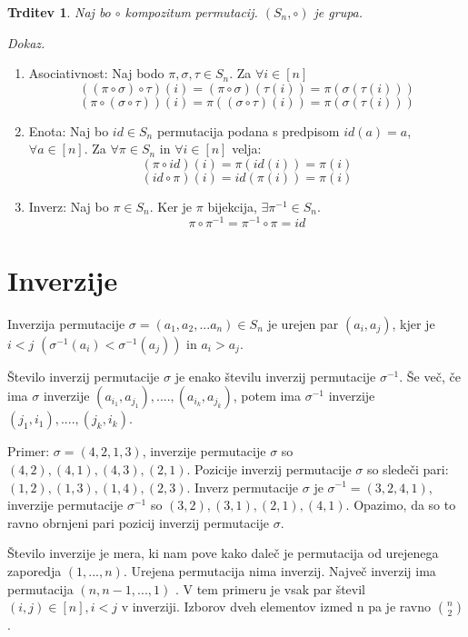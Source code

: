 \documentclass[a4paper, 12pt]{book}
\newtheorem{trditev}{Trditev}[chapter]
\newenvironment{dokaz}{\emph{Dokaz.}\ }{\hspace{\fill}{$\Box$}}
\let\ab\allowbreak
\begin{document}
\begin{trditev}
    Naj bo $\circ$ kompozitum permutacij. $(S_n, \circ)$ je grupa.
\end{trditev}
\begin{dokaz}
    \begin{enumerate}
        \item Asociativnost: Naj bodo $\pi, \sigma, \tau \in S_n$. Za $\forall i \in [n]$ 
        \[
            ((\pi \circ \sigma) \circ \tau)(i) = (\pi \circ \sigma)(\tau(i)) = \pi(\sigma(\tau(i)))
        \]
        \[
            (\pi \circ (\sigma \circ \tau))(i) = \pi((\sigma \circ \tau)(i)) = \pi(\sigma(\tau(i))) 
        \]
        \item Enota: Naj bo $id \in S_n$ permutacija podana s predpisom $id(a) = a$, $\forall a \in [n]$. Za $\forall \pi \in S_n$ in $\forall i \in [n]$ velja:
        \[
            (\pi \circ id)(i) = \pi(id(i)) = \pi(i)
        \]
        \[
            (id \circ \pi)(i) = id(\pi(i)) = \pi(i)
        \]
        \item Inverz: Naj bo $\pi \in S_n$. Ker je $\pi$ bijekcija, $\exists \pi^{-1} \in S_n$.
        \[
            \pi \circ \pi^{-1} = \pi^{-1} \circ \pi = id
        \]
    \end{enumerate}
\end{dokaz}

\chapter{ Inverzije }

Inverzija permutacije $\sigma = (a_1, a_2,... a_n) \in S_n$ je urejen par $(a_i, a_j)$, kjer je $i < j$ $(\sigma^{-1}(a_i) < \sigma^{-1}(a_j))$ in $a_i > a_j$.

Število inverzij permutacije $\sigma$ je enako številu inverzij permutacije $\sigma^{-1}$. Še več, če ima $\sigma$ inverzije $(a_{i_1}, a_{j_1}), ...., (a_{i_k}, a_{j_k})$, potem ima $\sigma^{-1}$ inverzije $(j_1, i_1), ...., (j_k, i_k)$.

Primer: $\sigma = (4, 2, 1, 3)$, inverzije permutacije $\sigma$ so $(4, 2), (4, 1), (4, 3), (2, 1)$. Pozicije inverzij permutacije $\sigma$ so sledeči pari: $(1, 2), (1, 3), (1, 4), (2, 3)$. Inverz permutacije $\sigma$ je $\sigma^{-1} = (3, 2, 4, 1)$, inverzije permutacije $\sigma^{-1}$ so $(3, 2), \ab (3, 1), (2, 1), (4, 1)$. Opazimo, da so to ravno obrnjeni pari pozicij inverzij permutacije $\sigma$.

Število inverzije je mera, ki nam pove kako daleč je permutacija od urejenega zaporedja $(1, ..., n)$. Urejena permutacija nima inverzij. Največ inverzij ima permutacija $(n, n-1, ..., 1)$ . V tem primeru je vsak par števil $(i, j) \in [n], i < j$ v inverziji. Izborov dveh elementov izmed n pa je ravno $n \choose 2$.
\end{document}
